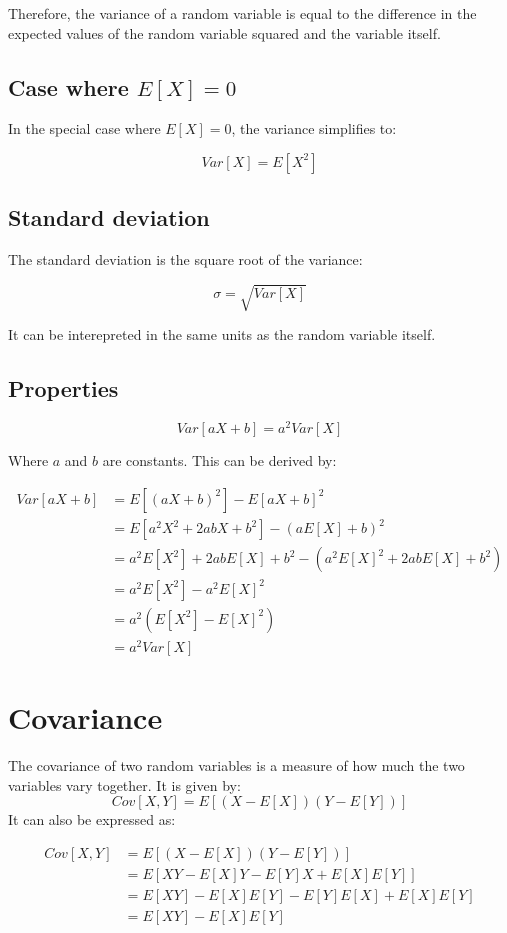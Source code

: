 \documentclass[12pt]{article}
\begin{document}
Therefore, the variance of a random variable is equal to the difference in the expected values of the random variable squared and the variable itself.

\subsection{\texorpdfstring{Case where $E[X] = 0$}{Case where E[X] = 0}}
In the special case where $E[X] = 0$, the variance simplifies to:

$$ Var[X] = E[X^2] $$

\subsection{Standard deviation}

The standard deviation is the square root of the variance:

$$ \sigma = \sqrt{Var[X]} $$

It can be interepreted in the same units as the random variable itself.

\subsection{Properties}

$$ Var[aX + b] = a^2 Var[X] $$
    
Where $a$ and $b$ are constants.
This can be derived by:

\begin{align*}
    Var[aX + b] &= E[(aX + b)^2] - E[aX + b]^2 \\
    &= E[a^2 X^2 + 2abX + b^2] - (aE[X] + b)^2 \\
    &= a^2 E[X^2] + 2abE[X] + b^2 - (a^2 E[X]^2 + 2abE[X] + b^2) \\
    &= a^2 E[X^2] - a^2 E[X]^2 \\
    &= a^2 (E[X^2] - E[X]^2) \\
    &= a^2 Var[X]
\end{align*}

\section{Covariance}
The covariance of two random variables is a measure of how much the two variables vary together.
It is given by:
$$ Cov[X,Y] = E[(X - E[X])(Y - E[Y])] $$
It can also be expressed as:

\begin{align*}
    Cov[X,Y] &= E[(X - E[X])(Y - E[Y])] \\
    &= E[XY - E[X]Y - E[Y]X + E[X]E[Y]] \\
    &= E[XY] - E[X]E[Y] - E[Y]E[X] + E[X]E[Y] \\
    &= E[XY] - E[X]E[Y]
\end{align*}
\end{document}
